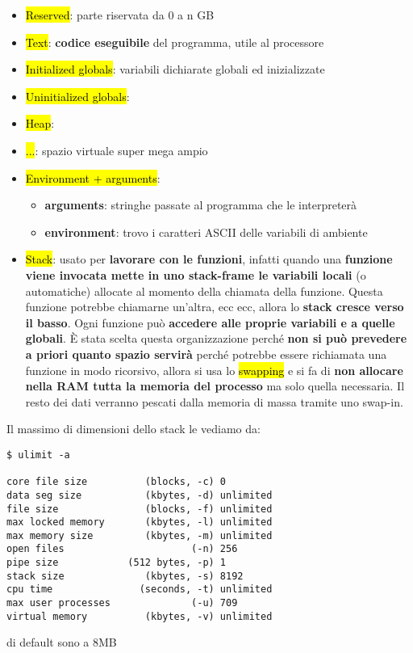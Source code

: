 \begin{itemize}
	\item \hl{Reserved}: parte riservata da 0 a n GB
	\item \hl{Text}: \textbf{codice eseguibile} del programma, utile al processore
	\item \hl{Initialized globals}: variabili dichiarate globali ed inizializzate
	\item \hl{Uninitialized globals}: 
	\item \hl{Heap}: 
	\item \hl{...}: spazio virtuale super mega ampio
	\item \hl{Environment + arguments}:
		\begin{itemize}
			\item \textbf{arguments}: stringhe passate al programma che le interpreterà
			\item \textbf{environment}: trovo i caratteri ASCII delle variabili di ambiente
		\end{itemize}
	\item \hl{Stack}: usato per \textbf{lavorare con le funzioni}, infatti quando una \textbf{funzione viene invocata mette in uno stack-frame le variabili locali} (o automatiche) allocate al momento della chiamata della funzione. Questa funzione potrebbe chiamarne un'altra, ecc ecc, allora lo \textbf{stack cresce verso il basso}. Ogni funzione può \textbf{accedere alle proprie variabili e a quelle globali}. È stata scelta questa organizzazione perché \textbf{non si può prevedere a priori quanto spazio servirà} perché potrebbe essere richiamata una funzione in modo ricorsivo, allora si usa lo \hl{swapping} e si fa di \textbf{non allocare nella RAM tutta la memoria del processo} ma solo quella necessaria. Il resto dei dati verranno pescati dalla memoria di massa tramite uno swap-in. 
\end{itemize}

Il massimo di dimensioni dello stack le vediamo da:

\begin{lstlisting}
$ ulimit -a

core file size          (blocks, -c) 0
data seg size           (kbytes, -d) unlimited
file size               (blocks, -f) unlimited
max locked memory       (kbytes, -l) unlimited
max memory size         (kbytes, -m) unlimited
open files                      (-n) 256
pipe size            (512 bytes, -p) 1
stack size              (kbytes, -s) 8192
cpu time               (seconds, -t) unlimited
max user processes              (-u) 709
virtual memory          (kbytes, -v) unlimited
\end{lstlisting}

di default sono a 8MB